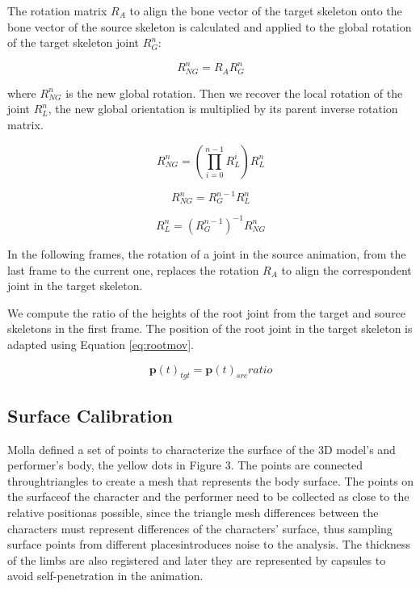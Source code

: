 \documentclass{vgtc}
\begin{document}
The rotation matrix \(R_{A}\) to align the bone vector of the target
skeleton onto the bone vector of the source skeleton is calculated and
applied to the global rotation of the target skeleton joint
\(R_{G}^{n}\):

\begin{equation}
        \label{eq:newglobal}
        R_{NG}^{n} = R_{A} R_{G}^{n}
        \end{equation}

where \(R_{NG}^{n}\) is the new global rotation. Then we recover the
local rotation of the joint \(R_{L}^{n}\), the new global orientation is
multiplied by its parent inverse rotation matrix.

\begin{equation}
        \label{eq:newglobal2}
        R_{NG}^{n} = \left(\prod_{i=0}^{n-1} R_{L}^{i}\right) R_{L}^{n} 
        \end{equation}

\begin{equation}
    \label{eq:newglobal3}
    R_{NG}^{n} = R_{G}^{n-1} R_{L}^{n}
    \end{equation}

\begin{equation}
    \label{eq:newglobal4}
    R_{L}^{n} = (R_{G}^{n-1})^{-1} R_{NG}^{n}
    \end{equation}

In the following frames, the rotation of a joint in the source
animation, from the last frame to the current one, replaces the rotation
\(R_{A}\) to align the correspondent joint in the target skeleton.

We compute the ratio of the heights of the root joint from the target
and source skeletons in the first frame. The position of the root joint
in the target skeleton is adapted using Equation \ref{eq:rootmov}.

\begin{equation}
    \label{eq:rootmov}
    \mathbf{p}(t)_{tgt} = \mathbf{p}(t)_{src} ratio
    \end{equation}

    \subsection{Surface Calibration}\label{surface-calibration}

Molla\cite{molla} defined a set of points to characterize the surface of
the 3D model's and performer's body, the yellow dots in Figure 3. The
points are connected throughtriangles to create a mesh that represents
the body surface. The points on the surfaceof the character and the
performer need to be collected as close to the relative positionas
possible, since the triangle mesh differences between the characters
must represent differences of the characters' surface, thus sampling
surface points from different placesintroduces noise to the analysis.
The thickness of the limbs are also registered and later they are
represented by capsules to avoid self-penetration in the animation.
\end{document}
